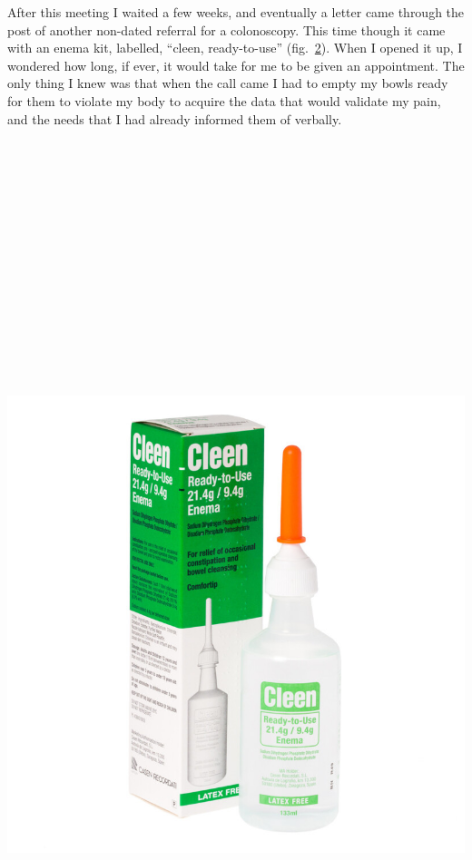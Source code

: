 After this meeting I waited a few weeks, and eventually a letter came
through the post of another non-dated referral for a colonoscopy. This
time though it came with an enema kit, labelled, ``cleen, ready-to-use''
(fig.~\protect\hyperlink{fig:cleen}{2}). When I opened it up, I wondered
how long, if ever, it would take for me to be given an appointment. The
only thing I knew was that when the call came I had to empty my bowls
ready for them to violate my body to acquire the data that would
validate my pain, and the needs that I had already informed them of
verbally.

\includegraphics[width=11.11111in,height=11.11111in]{../../Chapters/media_02_Crip-Tic_of_Vignettes/Pictures/1.png}

